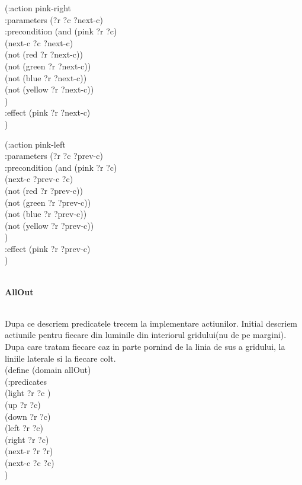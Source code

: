 \documentclass[a4paper,12pt]{report}
\begin{document}
  (:action pink-right\\
    :parameters (?r ?c ?next-c)\\
    :precondition (and (pink ?r ?c)\\
    			       (next-c ?c ?next-c)\\
    			       (not (red ?r ?next-c))\\
                       (not (green ?r ?next-c))\\
                       (not (blue ?r ?next-c))\\
                       (not (yellow ?r ?next-c))\\
                )\\
    :effect (pink ?r ?next-c)\\
  )  

  (:action pink-left\\
    :parameters (?r ?c ?prev-c)\\
    :precondition (and (pink ?r ?c)\\
    			       (next-c ?prev-c ?c)\\
    			       (not (red ?r ?prev-c))\\
                       (not (green ?r ?prev-c))\\
                       (not (blue ?r ?prev-c))\\
                       (not (yellow ?r ?prev-c))\\
                )\\
    :effect (pink ?r ?prev-c)\\
  )\\

\\



\begin{Large}
 \textbf{AllOut}\\
\end{Large}\\
  Dupa ce descriem predicatele trecem la implementare actiunilor. Initial descriem actiunile pentru fiecare din luminile din interiorul gridului(nu de pe margini). Dupa care tratam fiecare caz in parte pornind de la linia de sus a gridului, la liniile laterale si la fiecare colt.\\

(define (domain allOut)\\
(:predicates\\
	(light ?r ?c )\\
	(up ?r ?c)\\
	(down ?r ?c)\\
	(left ?r ?c)\\
	(right ?r ?c)\\
	(next-r ?r ?r)\\
	(next-c ?c ?c)\\
)\\
\end{document}
